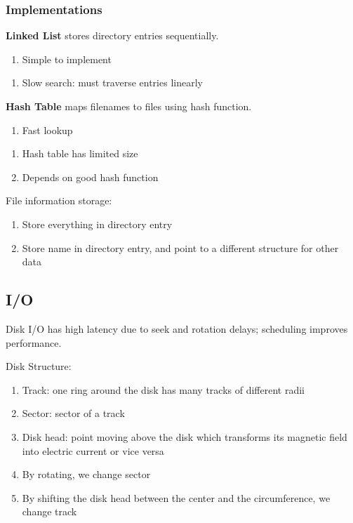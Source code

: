 \documentclass[12pt, a4paper]{article}
\begin{document}
\begin{multicols*}{3}
\subsubsection{Implementations}

\textbf{Linked List} stores directory entries sequentially.
\begin{enumerate}[$+$]
  \item Simple to implement
\end{enumerate}\vspace{-1pt}
\begin{enumerate}[$-$]
  \item Slow search: must traverse entries linearly
\end{enumerate}

\textbf{Hash Table} maps filenames to files using hash function.
\begin{enumerate}[$+$]
  \item Fast lookup
\end{enumerate}\vspace{-1pt}
\begin{enumerate}[$-$]
  \item Hash table has limited size
  \item Depends on good hash function
\end{enumerate}

File information storage:
\begin{enumerate}[\roman*.]
  \item Store everything in directory entry 
  \item Store name in directory entry, and point to a different structure for other data
\end{enumerate}
\vspace{-2em}
\colbreak
\subsection{I/O}
Disk I/O has high latency due to seek and rotation delays; scheduling improves performance.

Disk Structure:
\begin{enumerate}[\roman*.]
  \item Track: one ring around the disk has many tracks of different radii 
  \item Sector: sector of a track 
  \item Disk head: point moving above the disk which transforms its magnetic field into electric current or vice versa 
  \item By rotating, we change sector 
  \item By shifting the disk head between the center and the circumference, we change track
\end{enumerate}


\end{multicols*}
\end{document}
